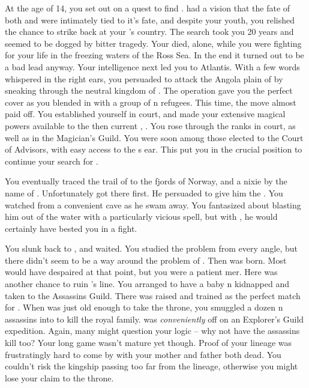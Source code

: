 \documentclass[char]{NeptuneBall}
\begin{document}
At the age of 14, you set out on a quest to find \iTrident{\MYname}. \cMother{} had a vision that the fate of both \pPacifica{} and \pAtlantis{} were intimately tied to it's fate, and despite your youth, you relished the chance to strike back at your \cExExKing{\parent}'s country. The search took you 20 years and seemed to be dogged by bitter tragedy. Your \cMother{\parent} died, alone, while you were fighting for your life in the freezing waters of the Ross Sea. In the end it turned out to be a bad lead anyway. Your intelligence next led you to Atlantis. With a few words whispered in the right ears, you persuaded \pPacifica{} to attack the Angola plain of \pAtlantis{} by sneaking through the neutral kingdom of \pIndia{}. The operation gave you the perfect cover as you blended in with a group of \pAtlantis{}n refugees. This time, the move almost paid off. You established yourself in court, and made your extensive magical powers available to the then current \cExKing{\King}, \cExKing{}. You rose through the ranks in court, as well as in the Magician's Guild. You were soon among those elected to the Court of Advisors, with easy access to the \cExKing{\King}s ear. This put you in the crucial position to continue your search for \iTrident{\MYname}.

You eventually traced the trail of  \iTrident{\MYname} to the fjords of Norway, and a nixie by the name of \cNixie{}. Unfortunately \cExKing{} got there first. He persuaded \cNixie{} to give him the \iTrident{\MYname}. You watched from a convenient cave as he swam away. You fantasized about blasting him out of the water with a particularly vicious spell, but with \iTrident{\MYname}, he would certainly have bested you in a fight.

You slunk back to \pAtlantis{}, and waited. You studied the problem from every angle, but there didn't seem to be a way around the problem of \iTrident{\MYname}. Then \cKing{} was born. Most would have despaired at that point, but you were a patient mer\cManta{\human}. Here was another chance to ruin \cExExKing{}'s line. You arranged to have a baby \pAtlantis{}n \cQueen{\kid} kidnapped and taken to the Assassins Guild. There \cQueen{\they} was raised and trained as the perfect match for \cKing{}. When \cKing{} was just old enough to take the throne, you smuggled a dozen \pPacifica{}n assassins into \pAtlantis{} to kill the royal family. \cKing{} was \emph{conveniently} off on an Explorer's Guild expedition. Again, many might question your logic -- why not have the assassins kill \cKing{} too? Your long game wasn't mature yet though. Proof of your lineage was frustratingly hard to come by with your mother and father both dead. You couldn't risk the kingship passing too far from the \cExExKing{} lineage, otherwise you might lose your claim to the throne.
\end{document}
